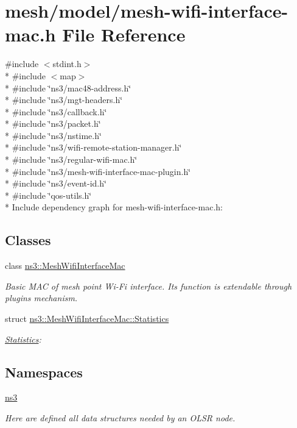 \hypertarget{mesh-wifi-interface-mac_8h}{}\section{mesh/model/mesh-\/wifi-\/interface-\/mac.h File Reference}
\label{mesh-wifi-interface-mac_8h}
{\ttfamily \#include $<$stdint.\+h$>$}\\*
{\ttfamily \#include $<$map$>$}\\*
{\ttfamily \#include \char`\"{}ns3/mac48-\/address.\+h\char`\"{}}\\*
{\ttfamily \#include \char`\"{}ns3/mgt-\/headers.\+h\char`\"{}}\\*
{\ttfamily \#include \char`\"{}ns3/callback.\+h\char`\"{}}\\*
{\ttfamily \#include \char`\"{}ns3/packet.\+h\char`\"{}}\\*
{\ttfamily \#include \char`\"{}ns3/nstime.\+h\char`\"{}}\\*
{\ttfamily \#include \char`\"{}ns3/wifi-\/remote-\/station-\/manager.\+h\char`\"{}}\\*
{\ttfamily \#include \char`\"{}ns3/regular-\/wifi-\/mac.\+h\char`\"{}}\\*
{\ttfamily \#include \char`\"{}ns3/mesh-\/wifi-\/interface-\/mac-\/plugin.\+h\char`\"{}}\\*
{\ttfamily \#include \char`\"{}ns3/event-\/id.\+h\char`\"{}}\\*
{\ttfamily \#include \char`\"{}qos-\/utils.\+h\char`\"{}}\\*
Include dependency graph for mesh-\/wifi-\/interface-\/mac.h\+:
\subsection*{Classes}
\begin{DoxyCompactItemize}
\item 
class \hyperlink{classns3_1_1MeshWifiInterfaceMac}{ns3\+::\+Mesh\+Wifi\+Interface\+Mac}
\begin{DoxyCompactList}\small\item\em Basic M\+AC of mesh point Wi-\/\+Fi interface. Its function is extendable through plugins mechanism. \end{DoxyCompactList}\item 
struct \hyperlink{structns3_1_1MeshWifiInterfaceMac_1_1Statistics}{ns3\+::\+Mesh\+Wifi\+Interface\+Mac\+::\+Statistics}
\begin{DoxyCompactList}\small\item\em \hyperlink{structns3_1_1MeshWifiInterfaceMac_1_1Statistics}{Statistics}\+: \end{DoxyCompactList}\end{DoxyCompactItemize}
\subsection*{Namespaces}
\begin{DoxyCompactItemize}
\item 
 \hyperlink{namespacens3}{ns3}
\begin{DoxyCompactList}\small\item\em Here are defined all data structures needed by an O\+L\+SR node. \end{DoxyCompactList}\end{DoxyCompactItemize}
